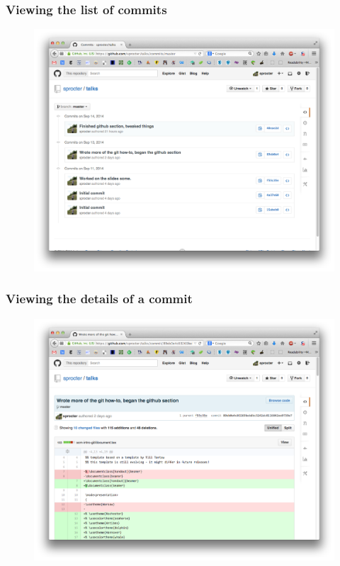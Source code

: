 \documentclass{beamer}
\begin{document}
\begin{frame}
\frametitle{Viewing the list of commits}

\begin{figure}[!t] \centering
\includegraphics[width=.8\textwidth]{figures/commit-history}
\end{figure}

\end{frame}

\begin{frame}
\frametitle{Viewing the details of a commit}

\begin{figure}[!t] \centering
\includegraphics[width=.8\textwidth]{figures/commit-diff}
\end{figure}

\end{frame}
\end{document}
